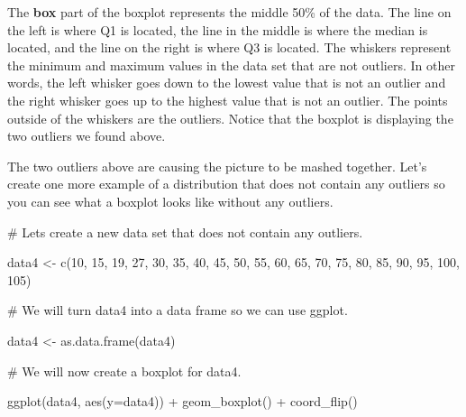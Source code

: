 \documentclass[
  letterpaper,
  DIV=11,
  numbers=noendperiod]{scrreprt}
\newenvironment{Shaded}{\begin{snugshade}}{\end{snugshade}}
\newcommand{\AttributeTok}[1]{\textcolor[rgb]{0.40,0.45,0.13}{#1}}
\newcommand{\CommentTok}[1]{\textcolor[rgb]{0.37,0.37,0.37}{#1}}
\newcommand{\DecValTok}[1]{\textcolor[rgb]{0.68,0.00,0.00}{#1}}
\newcommand{\FunctionTok}[1]{\textcolor[rgb]{0.28,0.35,0.67}{#1}}
\newcommand{\NormalTok}[1]{\textcolor[rgb]{0.00,0.23,0.31}{#1}}
\newcommand{\OtherTok}[1]{\textcolor[rgb]{0.00,0.23,0.31}{#1}}
\newcommand{\SpecialCharTok}[1]{\textcolor[rgb]{0.37,0.37,0.37}{#1}}
\begin{document}
The \textbf{box} part of the boxplot represents the middle 50\% of the
data. The line on the left is where Q1 is located, the line in the
middle is where the median is located, and the line on the right is
where Q3 is located. The whiskers represent the minimum and maximum
values in the data set that are not outliers. In other words, the left
whisker goes down to the lowest value that is not an outlier and the
right whisker goes up to the highest value that is not an outlier. The
points outside of the whiskers are the outliers. Notice that the boxplot
is displaying the two outliers we found above.

The two outliers above are causing the picture to be mashed together.
Let's create one more example of a distribution that does not contain
any outliers so you can see what a boxplot looks like without any
outliers.

\begin{Shaded}
\begin{Highlighting}[]
\CommentTok{\# Let\textquotesingle{}s create a new data set that does not contain any outliers.}

\NormalTok{data4 }\OtherTok{\textless{}{-}} \FunctionTok{c}\NormalTok{(}\DecValTok{10}\NormalTok{, }\DecValTok{15}\NormalTok{, }\DecValTok{19}\NormalTok{, }\DecValTok{27}\NormalTok{, }\DecValTok{30}\NormalTok{, }\DecValTok{35}\NormalTok{, }\DecValTok{40}\NormalTok{, }\DecValTok{45}\NormalTok{, }\DecValTok{50}\NormalTok{, }\DecValTok{55}\NormalTok{, }\DecValTok{60}\NormalTok{, }\DecValTok{65}\NormalTok{, }\DecValTok{70}\NormalTok{, }\DecValTok{75}\NormalTok{, }\DecValTok{80}\NormalTok{, }\DecValTok{85}\NormalTok{, }\DecValTok{90}\NormalTok{, }\DecValTok{95}\NormalTok{, }\DecValTok{100}\NormalTok{, }\DecValTok{105}\NormalTok{)}

\CommentTok{\# We will turn data4 into a data frame so we can use ggplot.}

\NormalTok{data4 }\OtherTok{\textless{}{-}} \FunctionTok{as.data.frame}\NormalTok{(data4)}

\CommentTok{\# We will now create a boxplot for data4.}

\FunctionTok{ggplot}\NormalTok{(data4, }\FunctionTok{aes}\NormalTok{(}\AttributeTok{y=}\NormalTok{data4)) }\SpecialCharTok{+}
  \FunctionTok{geom\_boxplot}\NormalTok{() }\SpecialCharTok{+}
  \FunctionTok{coord\_flip}\NormalTok{()}
\end{Highlighting}
\end{Shaded}
\end{document}
